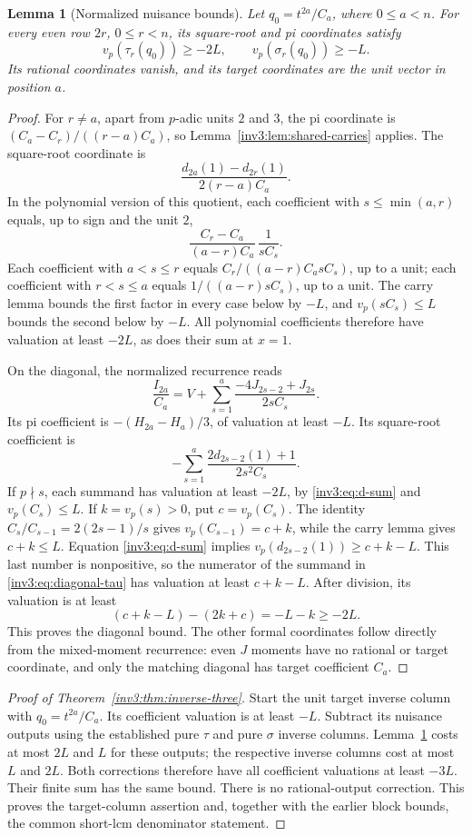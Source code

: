 \documentclass[11pt,a4paper]{article}
\numberwithin{equation}{section}
\newtheorem{lemma}[theorem]{Lemma}
\theoremstyle{definition}\newtheorem{definition}[theorem]{Definition}
\theoremstyle{remark}\newtheorem{remark}[theorem]{Remark}
\begin{document}
\begin{lemma}[Normalized nuisance bounds]\label{inv3:lem:normalized-nuisance}
Let $q_0=t^{2a}/C_a$, where $0\le a<n$. For every even row
$2r$, $0\le r<n$, its square-root and pi coordinates satisfy
\[
 v_p(\tau_r(q_0))\ge-2L,\qquad
 v_p(\sigma_r(q_0))\ge-L.
\]
Its rational coordinates vanish, and its target coordinates are the
unit vector in position $a$.
\end{lemma}
\begin{proof}
For $r\ne a$, apart from $p$-adic units $2$ and $3$, the pi
coordinate is
$(C_a-C_r)/((r-a)C_a)$, so Lemma~\ref{inv3:lem:shared-carries} applies.
The square-root coordinate is
\[
 \frac{d_{2a}(1)-d_{2r}(1)}{2(r-a)C_a}.
\]
In the polynomial version of this quotient, each coefficient with
$s\le\min(a,r)$ equals, up to sign and the unit $2$,
\[
 \frac{C_r-C_a}{(a-r)C_a}\,\frac1{sC_s}.
\]
Each coefficient with $a<s\le r$ equals
$C_r/((a-r)C_a sC_s)$, up to a unit; each coefficient with
$r<s\le a$ equals $1/((a-r)sC_s)$, up to a unit.
The carry lemma bounds the first factor in every case below by $-L$,
and $v_p(sC_s)\le L$ bounds the second below by $-L$.
All polynomial coefficients therefore have valuation at least $-2L$,
as does their sum at $x=1$.

On the diagonal, the normalized recurrence reads
\[
 \frac{I_{2a}}{C_a}
 =V+\sum_{s=1}^a\frac{-4J_{2s-2}+J_{2s}}{2sC_s}.
\]
Its pi coefficient is $-(H_{2a}-H_a)/3$, of valuation at least $-L$.
Its square-root coefficient is
\begin{equation}\label{inv3:eq:diagonal-tau}
 -\sum_{s=1}^a\frac{2d_{2s-2}(1)+1}{2s^2C_s}.
\end{equation}
If $p\nmid s$, each summand has valuation at least $-2L$, by
\eqref{inv3:eq:d-sum} and $v_p(C_s)\le L$.
If $k=v_p(s)>0$, put $c=v_p(C_s)$. The identity
$C_s/C_{s-1}=2(2s-1)/s$ gives
$v_p(C_{s-1})=c+k$, while the carry lemma gives $c+k\le L$.
Equation \eqref{inv3:eq:d-sum} implies
$v_p(d_{2s-2}(1))\ge c+k-L$. This last number is nonpositive,
so the numerator of the summand in \eqref{inv3:eq:diagonal-tau} has
valuation at least $c+k-L$. After division, its valuation is
at least
\[
 (c+k-L)-(2k+c)=-L-k\ge-2L.
\]
This proves the diagonal bound. The other formal coordinates follow
directly from the mixed-moment recurrence: even $J$ moments have no
rational or target coordinate, and only the matching diagonal has
 target coefficient $C_a$.
\end{proof}

\begin{proof}[Proof of Theorem~\ref{inv3:thm:inverse-three}]
Start the unit target inverse column with $q_0=t^{2a}/C_a$.
Its coefficient valuation is at least $-L$. Subtract its nuisance
outputs using the established pure $\tau$ and pure $\sigma$ inverse
columns. Lemma~\ref{inv3:lem:normalized-nuisance} costs at most $2L$
and $L$ for these outputs; the respective inverse columns cost at most
$L$ and $2L$. Both corrections therefore have all coefficient
valuations at least $-3L$. Their finite sum has the same bound.
There is no rational-output correction. This proves the target-column
assertion and, together with the earlier block bounds, the common
short-lcm denominator statement.
\end{proof}
\end{document}
